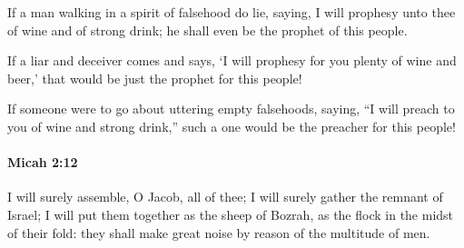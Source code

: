 			\begin{versebox}
					\item[BHS] 
					\item[LXX] 
					\item[ASV] If a man walking in a spirit of falsehood do lie, saying, I will prophesy unto thee of wine and of strong drink; he shall even be the prophet of this people.
					\item[NIV] If a liar and deceiver comes and says, ‘I will prophesy for you plenty of wine and beer,’ that would be just the prophet for this people!
					\item[NRSV] If someone were to go about uttering empty falsehoods, saying, “I will preach to you of wine and strong drink,” such a one would be the preacher for this people!
			\end{versebox}

		\paragraph{Micah 2:12} %
			\label{MICAH-2-12}

			I will surely assemble, O Jacob, all of thee; I will surely gather the remnant of Israel; I will put them together as the sheep of Bozrah, as the flock in the midst of their fold: they shall make great noise by reason of the multitude of men.

